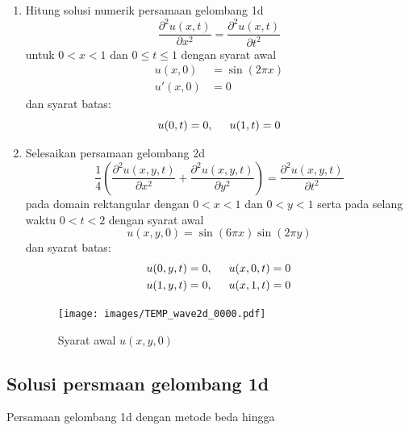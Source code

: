 \documentclass[10pt,bahasa]{article}
\begin{document}
\begin{enumerate}[label=(\alph*)]
%
\item Hitung solusi numerik persamaan gelombang 1d
\begin{equation}
\frac{\partial^2 u(x,t)}{\partial x^2} = \frac{\partial^2 u(x,t)}{\partial t^2}
\end{equation}
untuk $0 < x < 1$ dan $0 \leq t \leq 1$ dengan syarat awal
\begin{align*}
u(x,0)  & = \sin\left(2\pi x\right) \\
u'(x,0) & = 0
\end{align*}
dan syarat batas:
\begin{equation*}
u(0,t) = 0, \hspace{0.5cm} u(1,t) = 0
\end{equation*}
%
\item Selesaikan persamaan gelombang 2d
\begin{equation}
\frac{1}{4}\left(\frac{\partial^2 u(x,y,t)}{\partial x^2} +
\frac{\partial^2 u(x,y,t)}{\partial y^2}\right)
= \frac{\partial^2 u(x,y,t)}{\partial t^2}
\end{equation}
pada domain rektangular dengan $0 < x < 1$ dan $0 < y < 1$ serta
pada selang waktu $0 < t < 2$ dengan syarat awal
\begin{equation*}
u(x,y,0) = \sin(6\pi x)\sin(2\pi y)
\end{equation*}
dan syarat batas:
\begin{align*}
u(0,y,t) = 0, \hspace{0.5cm} u(x,0,t) = 0 \\
u(1,y,t) = 0, \hspace{0.5cm} u(x,1,t) = 0
\end{align*}

\begin{figure}[H]
\centering
\texttt{[image: images/TEMP\_wave2d\_0000.pdf]}
\par
\caption{Syarat awal $u(x,y,0)$}
\end{figure}
%
\end{enumerate}

\subsection*{Solusi persmaan gelombang 1d}

Persamaan gelombang 1d dengan metode beda hingga
\end{document}
